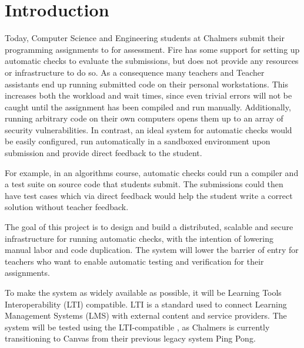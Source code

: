 \chapter{Introduction}

Today, Computer Science and Engineering students at Chalmers submit their programming assignments to \cite{2019Fire:System} for assessment. Fire has some support for setting up automatic checks to evaluate the submissions, but does not provide any resources or infrastructure to do so. As a consequence many teachers and Teacher assistants end up running submitted code on their personal workstations. This increases both the workload and wait times, since even trivial errors will not be caught until the assignment has been compiled and run manually. Additionally, running arbitrary code on their own computers opens them up to an array of security vulnerabilities. In contrast, an ideal system for automatic checks would be easily configured, run automatically in a sandboxed environment upon submission and provide direct feedback to the student.

For example, in an algorithms course, automatic checks could run a compiler and a test suite on source code that students submit. The submissions could then have test cases which via direct feedback would help the student write a correct solution without teacher feedback.

The goal of this project is to design and build a distributed, scalable and secure infrastructure for running automatic checks, with the intention of lowering manual labor and code duplication. The system will lower the barrier of entry for teachers who want to enable automatic testing and verification for their assignments.

To make the system as widely available as possible, it will be Learning Tools Interoperability (LTI) compatible. LTI is a standard used to connect Learning Management Systems (LMS) with external content and service providers. The system will be tested using the LTI-compatible \cite{2019Canvas}, as Chalmers is currently transitioning to Canvas from their previous legacy system Ping Pong.
